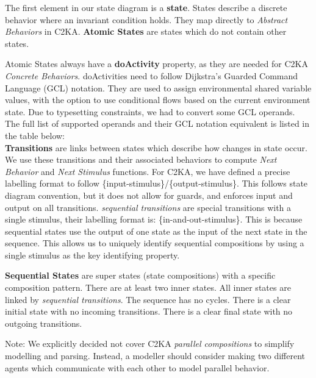 \documentclass[11pt]{article}
\begin{document}
    The first element in our state diagram is a \textbf{state}.
    States describe a discrete behavior where an invariant condition holds.
    They map directly to \textit{Abstract Behaviors} in C2KA\@.
    \textbf{Atomic States} are states which do not contain other states.

    Atomic States always have a \textbf{doActivity} property,
    as they are needed for C2KA \textit{Concrete Behaviors}.
    doActivities need to follow Dijkstra's Guarded Command Language (GCL) notation.
    They are used to assign environmental shared variable values,
    with the option to use conditional flows based on the current environment state.
    Due to typesetting constraints, we had to convert some GCL operands.
    The full list of supported operands and their GCL notation equivalent is listed in the table below:
    \\

    \textbf{Transitions} are links between states which describe how changes in state occur.
    We use these transitions and their associated behaviors to compute \textit{Next Behavior} and \textit{Next Stimulus} functions.
    For C2KA, we have defined a precise labelling format to follow \{input-stimulus\}/\{output-stimulus\}.
    This follows state diagram convention, but it does not allow for guards,
    and enforces input and output on all transitions.
    \textit{sequential transitions} are special transitions with a single stimulus, their labelling format is: \{in-and-out-stimulus\}.
    This is because sequential states use the output of one state as the input of the next state in the sequence.
    This allows us to uniquely identify sequential compositions by using a single stimulus as the key identifying property.

    \textbf{Sequential States} are super states (state compositions) with a specific composition pattern.
    There are at least two inner states.
    All inner states are linked by \textit{sequential transitions}.
    The sequence has no cycles.
    There is a clear initial state with no incoming transitions.
    There is a clear final state with no outgoing transitions.

    Note: We explicitly decided not cover C2KA \textit{parallel compositions} to simplify modelling and parsing.
    Instead, a modeller should consider making two different agents which communicate
    with each other to model parallel behavior.
\end{document}

